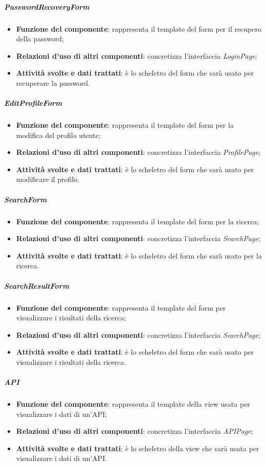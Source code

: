\subparagraph{PasswordRecoveryForm}
\begin{itemize}
	\item \textbf{Funzione del componente}: rappresenta il template del form per il recupero della password;
	\item \textbf{Relazioni d'uso di altri componenti}: concretizza l'interfaccia \textit{LoginPage};
	\item \textbf{Attività svolte e dati trattati}: è lo scheletro del form che sarà usato per recuperare la password.
\end{itemize}

\subparagraph{EditProfileForm}
\begin{itemize}
	\item \textbf{Funzione del componente}: rappresenta il template del form per la modifica del profilo utente;
	\item \textbf{Relazioni d'uso di altri componenti}: concretizza l'interfaccia \textit{ProfilePage};
	\item \textbf{Attività svolte e dati trattati}: è lo scheletro del form che sarà usato per modificare il profilo.
\end{itemize}

\subparagraph{SearchForm}
\begin{itemize}
	\item \textbf{Funzione del componente}: rappresenta il template del form per la ricerca;
	\item \textbf{Relazioni d'uso di altri componenti}: concretizza l'interfaccia \textit{SearchPage};
	\item \textbf{Attività svolte e dati trattati}: è lo scheletro del form che sarà usato per la ricerca.
\end{itemize}

\subparagraph{SearchResultForm}
\begin{itemize}
	\item \textbf{Funzione del componente}: rappresenta il template del form per visualizzare i risultati della ricerca;
	\item \textbf{Relazioni d'uso di altri componenti}: concretizza l'interfaccia \textit{SearchPage};
	\item \textbf{Attività svolte e dati trattati}: è lo scheletro del form che sarà usato per visualizzare i risultati della ricerca.
\end{itemize}

\subparagraph{API}
\begin{itemize}
	\item \textbf{Funzione del componente}:  rappresenta il template della view usata per visualizzare i dati di un'API;
	\item \textbf{Relazioni d'uso di altri componenti}: concretizza l'interfaccia \textit{APIPage};
	\item \textbf{Attività svolte e dati trattati}: è lo scheletro della view che sarà usata per visualizzare i dati di un'API.
\end{itemize}

